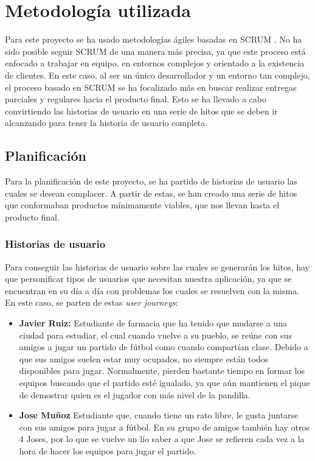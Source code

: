 \chapter{Metodología utilizada}

Para este proyecto se ha usado metodologías ágiles basadas en SCRUM \cite{scrum}. No ha sido posible seguir SCRUM de una manera más precisa, ya que este proceso está enfocado a trabajar en
equipo, en entornos complejos y orientado a la existencia de clientes. En este caso, al ser un único desarrollador y un entorno tan complejo, el proceso basado en SCRUM se ha
focalizado más en buscar realizar entregas parciales y regulares hacia el producto final. Esto se ha llevado a cabo convirtiendo las historias de usuario en una serie de hitos
que se deben ir alcanzando para tener la historia de usuario completa.\\

\section{Planificación}

Para la planificación de este proyecto, se ha partido de historias de usuario las cuales se desean complacer. A partir de estas, se han creado una serie de hitos que conformaban productos mínimamente viables,
 que nos llevan hasta el producto final.

\subsection{Historias de usuario}

Para conseguir las historias de usuario sobre las cuales se generarán los hitos, hay que personificar tipos de usuarios que necesitan nuestra aplicación, ya que se encuentran en su día a día
con problemas los cuales se resuelven con la misma. En este caso, se parten de estas \textit{user journeys}:

\newpage

\begin{itemize}
    \item \textbf{Javier Ruiz:} Estudiante de farmacia que ha tenido que mudarse a una ciudad para estudiar, el cual cuando vuelve a su pueblo,
     se reúne con sus amigos a jugar un partido de fútbol como cuando compartían clase. Debido a que sus amigos suelen estar muy ocupados,
     no siempre están todos disponibles para jugar. Normalmente, pierden bastante tiempo en formar los equipos buscando que el partido esté igualado,
     ya que aún mantienen el pique de demostrar quien es el jugador con más nivel de la pandilla. 
    \item \textbf{Jose Muñoz} Estudiante que, cuando tiene un rato libre, le gusta juntarse con sus amigos para jugar a fútbol. En su grupo de amigos también hay otros 4 Joses, por lo que
    se vuelve un lío saber a que Jose se refieren cada vez a la hora de hacer los equipos para jugar el partido.
\end{itemize}

